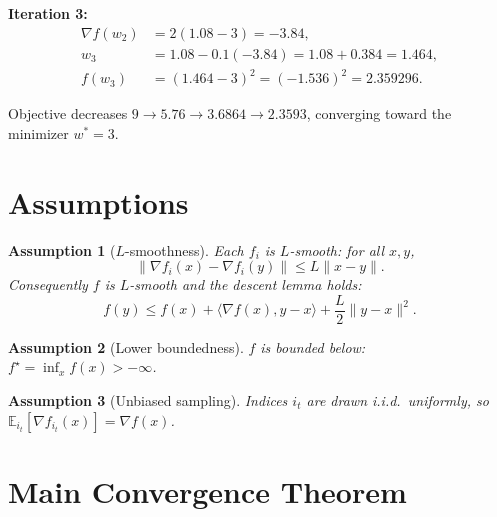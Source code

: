 \documentclass[11pt]{article}
\newtheorem{assumption}{Assumption}
\begin{document}
\textbf{Iteration 3:}
\begin{align*}
\nabla f(w_2) &= 2(1.08-3) = -3.84,\\
w_3 &= 1.08 - 0.1(-3.84) = 1.08 + 0.384 = 1.464,\\
f(w_3) &= (1.464-3)^2 = (-1.536)^2 = 2.359296.
\end{align*}

Objective decreases $9 \to 5.76 \to 3.6864 \to 2.3593$, converging toward the minimizer $w^*=3$.

\section*{Assumptions}

\begin{assumption}[$L$-smoothness]\label{a:smooth}
Each $f_i$ is $L$-smooth: for all $x,y$,
\[
\|\nabla f_i(x) - \nabla f_i(y)\| \le L\|x-y\|.
\]
Consequently $f$ is $L$-smooth and the descent lemma holds:
\[
f(y) \le f(x) + \langle \nabla f(x), y-x\rangle + \frac{L}{2}\|y-x\|^2.
\]
\end{assumption}

\begin{assumption}[Lower boundedness]\label{a:lb}
$f$ is bounded below: $f^\star = \inf_x f(x) > -\infty$.
\end{assumption}

\begin{assumption}[Unbiased sampling]\label{a:unbias}
Indices $i_t$ are drawn i.i.d.\ uniformly, so $\mathbb{E}_{i_t}[\nabla f_{i_t}(x)] = \nabla f(x)$.
\end{assumption}

\section*{Main Convergence Theorem}
\end{document}
